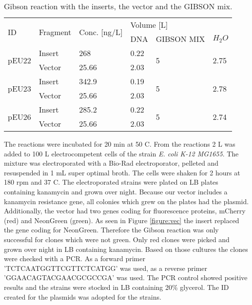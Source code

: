 \begin{table}[H]
	\begin{tabular}{|llllll|}
		\hline
		\multirow{2}{*}{ID}    & \multirow{2}{*}{Fragment} & \multirow{2}{*}{Conc. [ng/\textmu L]} & \multicolumn{3}{l|}{Volume [\textmu L]}           \\
		&                           &                                       & DNA  & GIBSON MIX         & $H_2O$                  \\ \hline
		\multirow{2}{*}{pEU22} & Insert                    & 268                                   & 0.22 & \multirow{2}{*}{5} & \multirow{2}{*}{2.75} \\
		& Vector                    & 25.66                                 & 2.03 &                    &                       \\ \hline
		\multirow{2}{*}{pEU23} & Insert                    & 342.9                                 & 0.19 & \multirow{2}{*}{5} & \multirow{2}{*}{2.78} \\
		& Vector                    & 25.66                                 & 2.03 &                    &                       \\ \hline
		\multirow{2}{*}{pEU26} & Insert                     & 285.2                                 & 0.22 & \multirow{2}{*}{5} & \multirow{2}{*}{2.74} \\
		& Vector                    & 25.66                                 & 2.03 &                    &                       \\ \hline
	\end{tabular}
	\caption{Gibson reaction with the inserts, the vector and the GIBSON mix.}
\end{table}
The reactions were incubated for 20 min at 50 \degree C. From the reactions 2 \textmu L was added to 100 \textmu L electrocompetent cells of the strain \textit{E. coli K-12 MG1655}. The mixture was electroporated with a Bio-Rad electroporator, pelleted and resuspended in 1 mL super optimal broth. The cells were shaken for 2 hours at 180 rpm and 37 \degree C. The electroporated strains were plated on LB plates containing kanamycin  and grown over night. Because our vector includes a kanamycin resistance gene, all colonies which grew on the plates had the plasmid.  Additionally, the vector had two genes coding for fluorescence proteins, mCherry (red) and NeonGreen (green). As seen in Figure \ref{figure:vec} the insert replaced the gene coding for NeonGreen. Therefore the Gibson reaction was only successful for clones which were not green. Only red clones were picked and grown over night in LB containing kanamycin. Based on those cultures the clones were checked with a PCR. As a forward primer 'TCTCAATGGTTCGTTCTCATGG' was used, as a reverse primer 'GGAACAGTACGAACGCGCCGA' was used. The PCR control showed positive results and the strains were stocked in LB containing 20\% glycerol.
The ID created for the plasmids was adopted for the strains. 


